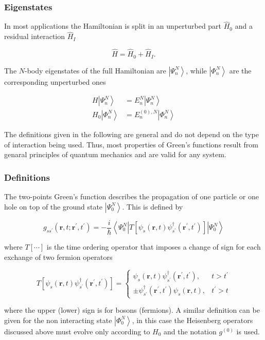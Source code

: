 \documentclass[compress]{beamer}
\begin{document}
\frame
{
\frametitle{Eigenstates}
\begin{small}
{\scriptsize

  In most applications the Hamiltonian is split in an unperturbed part $\hat{H}_{0}$ and a residual interaction $\hat{H}_I$

$$
\hat{H}=\hat{H}_{0}+\hat{H}_I .
$$

The $N$-body eigenstates  of the full Hamiltonian are $\left|\Psi_{n}^{N}\right\rangle$, while $\left|\Phi_{n}^{N}\right\rangle$ are the corresponding unperturbed ones

$$
\begin{aligned}
H\left|\Psi_{n}^{N}\right\rangle & =E_{n}^{N}\left|\Psi_{n}^{N}\right\rangle \\
H_{0}\left|\Phi_{n}^{N}\right\rangle & =E_{n}^{(0), N}\left|\Phi_{n}^{N}\right\rangle
\end{aligned}
$$

The definitions given in the following are general and do not depend on the type of interaction being used. Thus, most properties of Green's functions result from genaral principles of quantum mechanics and are valid for any system.
}
\end{small}
}


\frame
{
\frametitle{Definitions}
\begin{small}
{\scriptsize
The two-points Green's function describes the propagation of one particle or one hole on top of the ground state $\left|\Psi_{0}^{N}\right\rangle$. This is defined by

$$
g_{s s^{\prime}}\left(\mathbf{r}, t ; \mathbf{r}^{\prime}, t^{\prime}\right)=-\frac{i}{\hbar}\left\langle\Psi_{0}^{N}\left|T\left[\psi_{s}(\mathbf{r}, t) \psi_{s^{\prime}}^{\dagger}\left(\mathbf{r}^{\prime}, t^{\prime}\right)\right]\right| \Psi_{0}^{N}\right\rangle
$$

where $T[\cdots]$ is the time ordering operator that imposes a change of sign for each exchange of two fermion operators

$$
T\left[\psi_{s}(\mathbf{r}, t) \psi_{s^{\prime}}^{\dagger}\left(\mathbf{r}^{\prime}, t^{\prime}\right)\right]= \begin{cases}\psi_{s}(\mathbf{r}, t) \psi_{s^{\prime}}^{\dagger}\left(\mathbf{r}^{\prime}, t^{\prime}\right), & t>t^{\prime} \\ \pm \psi_{s^{\prime}}^{\dagger}\left(\mathbf{r}^{\prime}, t^{\prime}\right) \psi_{s}(\mathbf{r}, t), & t^{\prime}>t\end{cases}
$$

where the upper (lower) sign is for bosons (fermions). A similar definition can be given for the non interacting state $\left|\Phi_{0}^{N}\right\rangle$, in this case the Heisenberg operators discussed above must evolve only according to $H_{0}$ and the notation $g^{(0)}$ is used.
}
\end{small}
}
\end{document}
